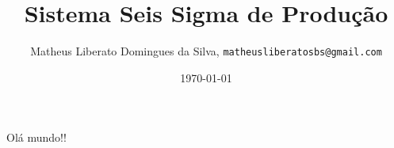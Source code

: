 \documentclass{report}
\author{Matheus Liberato Domingues da Silva, \texttt{matheusliberatosbs@gmail.com}}
\title{ Sistema Seis Sigma de Produção}
\date{\today}
\begin{document}
	\maketitle

	Olá mundo!!
\end{document}
